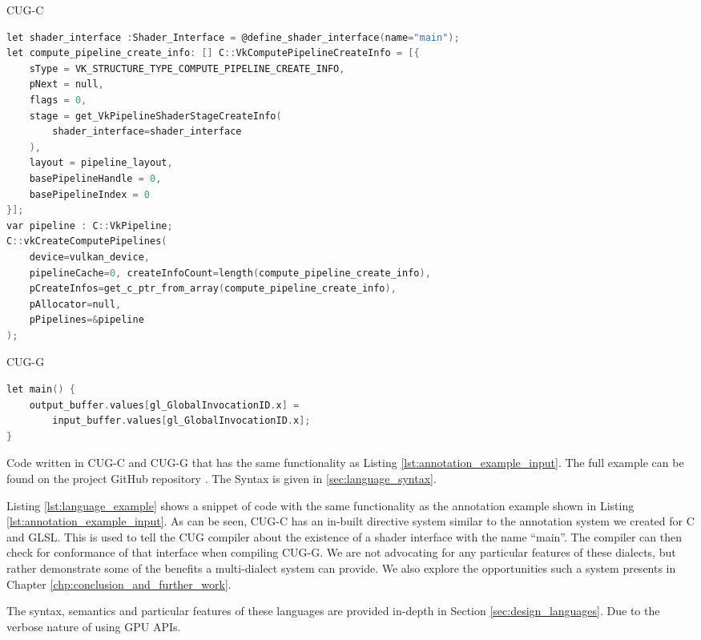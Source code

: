 \documentclass[a4paper,12pt,twoside,openright]{report}
\begin{document}
\begin{lstfloat}
\begin{center} CUG-C \end{center}
\begin{lstlisting}[language=C]
let shader_interface :Shader_Interface = @define_shader_interface(name="main");
let compute_pipeline_create_info: [] C::VkComputePipelineCreateInfo = [{
    sType = VK_STRUCTURE_TYPE_COMPUTE_PIPELINE_CREATE_INFO,
    pNext = null,
    flags = 0,
    stage = get_VkPipelineShaderStageCreateInfo(
        shader_interface=shader_interface
    ),
    layout = pipeline_layout,
    basePipelineHandle = 0,
    basePipelineIndex = 0
}];
var pipeline : C::VkPipeline;
C::vkCreateComputePipelines(
    device=vulkan_device,
    pipelineCache=0, createInfoCount=length(compute_pipeline_create_info),
    pCreateInfos=get_c_ptr_from_array(compute_pipeline_create_info),
    pAllocator=null,
    pPipelines=&pipeline
);
\end{lstlisting}
\begin{center} CUG-G \end{center}
\begin{lstlisting}[language=C]
let main() {
    output_buffer.values[gl_GlobalInvocationID.x] =
        input_buffer.values[gl_GlobalInvocationID.x];
}
\end{lstlisting}
\caption{Code written in CUG-C and CUG-G that has the same functionality as
Listing \ref{lst:annotation_example_input}. The full example can be found on
the project GitHub repository \cite{ProjectSource}. The Syntax is given in
\ref{sec:language_syntax}.}
\label{lst:language_example}
\end{lstfloat}

Listing \ref{lst:language_example} shows a snippet of code with the same
functionality as the annotation example shown in Listing
\ref{lst:annotation_example_input}. As can be seen, CUG-C has an in-built
directive system similar to the annotation system we created for C and GLSL.
This is used to tell the CUG compiler about the existence of a shader interface
with the name ``main''. The compiler can then check for conformance of that
interface when compiling CUG-G. We are not advocating for any particular
features of these dialects, but rather demonstrate some of the benefits a
multi-dialect system can provide. We also explore the opportunities such a
system presents in Chapter \ref{chp:conclusion_and_further_work}.

The syntax, semantics and particular features of these languages are provided
in-depth in Section \ref{sec:design_languages}. Due to the verbose nature of
using GPU APIs.
\end{document}
